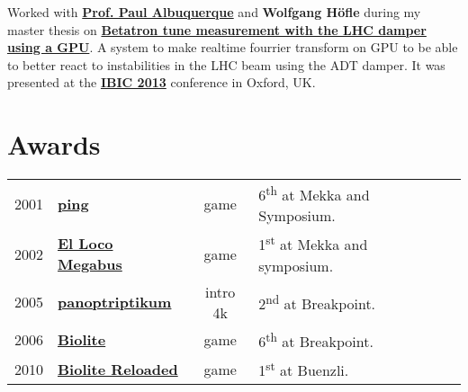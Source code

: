 \documentclass[a4paper]{deedy-resume} %
\begin{document}
\begin{minipage}[t]{0.66\textwidth}
Worked with
\textbf{\href{http://ch.linkedin.com/pub/paul-albuquerque/12/366/809}{Prof. Paul Albuquerque}}
and
\textbf{Wolfgang Höf\/le} during my master thesis on
\textbf{\href{http://cds.cern.ch/record/1545785?ln=en}{Betatron tune measurement
with the LHC damper using a GPU}}. A system to make realtime fourrier transform
on GPU to be able to better react to instabilities in the LHC beam using the ADT
damper. It was presented at the \textbf{\href{http://www.ibic2013.org}{IBIC 2013}}
conference in Oxford, UK.

\sectionspace %





\section{Awards}

\begin{tabular}{rlcll}
2001 & \textbf{\href{http://www.pouet.net/prod.php?which=5691}{ping}} & game & 6\textsuperscript{th} at Mekka and Symposium. \\
2002 & \textbf{\href{http://www.pouet.net/prod.php?which=5652}{El Loco Megabus}} & game & 1\textsuperscript{st} at Mekka and symposium. \\
2005 & \textbf{\href{http://www.pouet.net/prod.php?which=16393}{panoptriptikum}} & intro 4k & 2\textsuperscript{nd} at Breakpoint. \\
2006 & \textbf{\href{http://www.pouet.net/prod.php?which=24578}{Biolite}} & game & 6\textsuperscript{th} at Breakpoint. \\
2010 & \textbf{\href{http://www.pouet.net/prod.php?which=55711}{Biolite Reloaded}} & game & 1\textsuperscript{st} at Buenzli. \\
\end{tabular}



\end{minipage}
\end{document}
